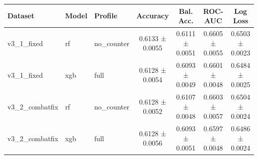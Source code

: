 \begin{tabular}{lllcccc}
Dataset & Model & Profile & Accuracy & Bal. Acc. & ROC-AUC & Log Loss \\
\hline
v3_1_fixed & rf & no_counter & 0.6133 ± 0.0055 & 0.6111 ± 0.0051 & 0.6605 ± 0.0055 & 0.6503 ± 0.0023 \\
v3_1_fixed & xgb & full & 0.6128 ± 0.0054 & 0.6093 ± 0.0049 & 0.6601 ± 0.0048 & 0.6484 ± 0.0025 \\
v3_2_combatfix & rf & no_counter & 0.6128 ± 0.0052 & 0.6107 ± 0.0048 & 0.6603 ± 0.0057 & 0.6504 ± 0.0024 \\
v3_2_combatfix & xgb & full & 0.6128 ± 0.0056 & 0.6093 ± 0.0051 & 0.6597 ± 0.0048 & 0.6486 ± 0.0024 \\
\end{tabular}